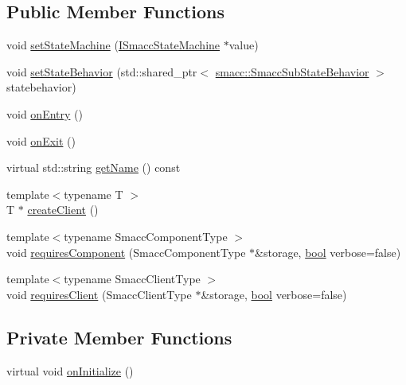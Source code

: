 \subsection*{Public Member Functions}
\begin{DoxyCompactItemize}
\item 
void \hyperlink{classsmacc_1_1Orthogonal_a05f65c01344a6c8593f7f88c0ca19654}{set\+State\+Machine} (\hyperlink{classsmacc_1_1ISmaccStateMachine}{I\+Smacc\+State\+Machine} $\ast$value)
\item 
void \hyperlink{classsmacc_1_1Orthogonal_a0476ba0e6575824893947918567ebbaa}{set\+State\+Behavior} (std\+::shared\+\_\+ptr$<$ \hyperlink{classsmacc_1_1SmaccSubStateBehavior}{smacc\+::\+Smacc\+Sub\+State\+Behavior} $>$ statebehavior)
\item 
void \hyperlink{classsmacc_1_1Orthogonal_a77888104f276bdbd177d69cf23f11a56}{on\+Entry} ()
\item 
void \hyperlink{classsmacc_1_1Orthogonal_a71c0df3d9e8327e65286e1ce0a3a7043}{on\+Exit} ()
\item 
virtual std\+::string \hyperlink{classsmacc_1_1Orthogonal_ae1ad57a2fda4d7f2ecf708c342fc1bb9}{get\+Name} () const 
\item 
{\footnotesize template$<$typename T $>$ }\\T $\ast$ \hyperlink{classsmacc_1_1Orthogonal_a7e1a5d0cf9fc07e4b6052c692aa73b1d}{create\+Client} ()
\item 
{\footnotesize template$<$typename Smacc\+Component\+Type $>$ }\\void \hyperlink{classsmacc_1_1Orthogonal_a098b5be0f89d0911afc44c10b756ef2a}{requires\+Component} (Smacc\+Component\+Type $\ast$\&storage, \hyperlink{classbool}{bool} verbose=false)
\item 
{\footnotesize template$<$typename Smacc\+Client\+Type $>$ }\\void \hyperlink{classsmacc_1_1Orthogonal_af6f6d9cc5bf5433f5fe3b640a6a0b8aa}{requires\+Client} (Smacc\+Client\+Type $\ast$\&storage, \hyperlink{classbool}{bool} verbose=false)
\end{DoxyCompactItemize}
\subsection*{Private Member Functions}
\begin{DoxyCompactItemize}
\item 
virtual void \hyperlink{classsmacc_1_1Orthogonal_a7a3da420b1554e20aea3ed01067df05c}{on\+Initialize} ()
\end{DoxyCompactItemize}

